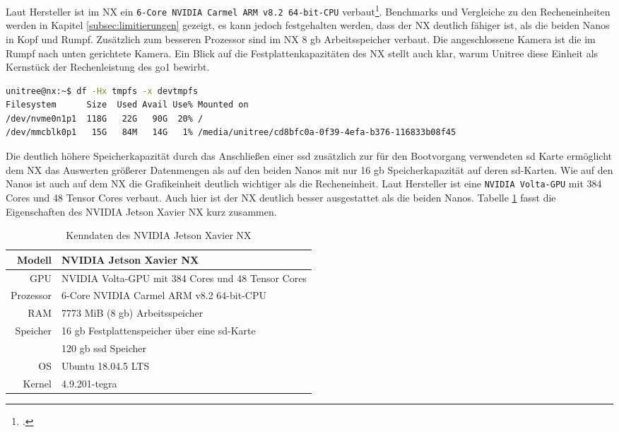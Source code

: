 Laut Hersteller ist im NX ein \texttt{6-Core NVIDIA Carmel ARM v8.2 64-\allowbreak bit-\allowbreak CPU} verbaut\footcite{nvidia_website_vergleich}.
Benchmarks und Vergleiche zu den Recheneinheiten werden in Kapitel \ref{subsec:limitierungen} gezeigt, es kann jedoch
festgehalten werden, dass der NX deutlich fähiger ist, als die beiden Nanos in Kopf und Rumpf.
Zusätzlich zum besseren Prozessor sind im NX \num{8} \gls{gb} Arbeitsspeicher verbaut.
Die angeschlossene Kamera ist die im Rumpf nach unten gerichtete Kamera.
Ein Blick auf die Festplattenkapazitäten des NX stellt auch klar, warum Unitree diese Einheit als Kernstück der Rechenleistung des
\gls{go1} bewirbt.

\begin{lstlisting}[language=sh, label=lst:nx-fs,columns=fixed]
unitree@nx:~$ df -Hx tmpfs -x devtmpfs
Filesystem      Size  Used Avail Use% Mounted on
/dev/nvme0n1p1  118G   22G   90G  20% /
/dev/mmcblk0p1   15G   84M   14G   1% /media/unitree/cd8bfc0a-0f39-4efa-b376-116833b08f45
\end{lstlisting}

Die deutlich höhere Speicherkapazität durch das Anschließen einer \gls{ssd} zusätzlich zur für den Bootvorgang verwendeten
\gls{sd} Karte ermöglicht dem NX das Auswerten größerer Datenmengen als auf den beiden Nanos mit nur \num{16} \gls{gb}
Speicherkapazität auf deren \gls{sd}-Karten.
Wie auf den Nanos ist auch auf dem NX die Grafikeinheit deutlich wichtiger als die Recheneinheit.
Laut Hersteller ist eine \texttt{NVIDIA Volta-GPU} mit 384 Cores und 48 Tensor Cores verbaut.
Auch hier ist der NX deutlich besser ausgestattet als die beiden Nanos.
Tabelle \ref{tab:data-nx} fasst die Eigenschaften des NVIDIA Jetson Xavier NX kurz zusammen.

\begin{table}[h]
    \centering
    \begin{tabularx}{\textwidth}{|r|X|}
        \hline
        Modell    & NVIDIA Jetson Xavier NX                                        \\ \hline
        GPU       & NVIDIA Volta-GPU mit 384 Cores und 48 Tensor Cores             \\ \hline
        Prozessor & 6-Core NVIDIA Carmel ARM v8.2 64-bit-CPU                       \\ \hline
        RAM       & \num{7773} MiB (\num{8} \gls{gb}) Arbeitsspeicher              \\ \hline
        Speicher  & \num{16} \gls{gb} Festplattenspeicher über eine \gls{sd}-Karte \\
        & \num{120} \gls{gb} \gls{ssd} Speicher                          \\ \hline
        OS        & Ubuntu 18.04.5 LTS                                             \\ \hline
        Kernel    & 4.9.201-tegra                                                  \\ \hline
    \end{tabularx}\caption{Kenndaten des NVIDIA Jetson Xavier NX}\label{tab:data-nx}
\end{table}





